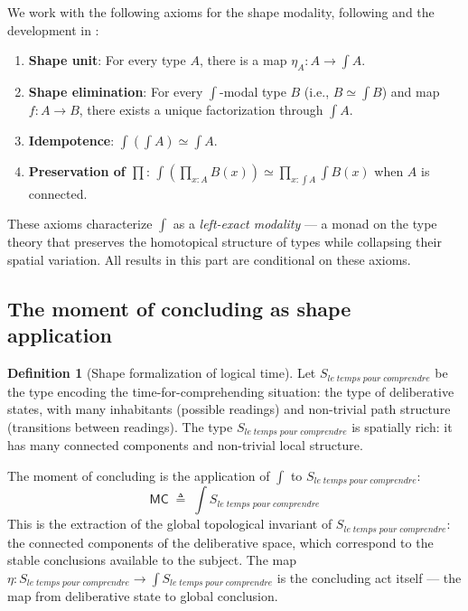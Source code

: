 \documentclass[12pt]{article}
\theoremstyle{definition}
\newtheorem{definition}{Definition}
\theoremstyle{remark}
\newcommand{\shapemod}{\int}                    %
\newcommand{\TC}{le\;temps\;pour\;comprendre}
\begin{document}
We work with the following axioms for the shape modality, following \cite{shulman2018} and the development in \cite{corfield2020}:

\begin{enumerate}
\item \textbf{Shape unit}: For every type $A$, there is a map $\eta_A : A \to \shapemod A$.
\item \textbf{Shape elimination}: For every $\shapemod$-modal type $B$ (i.e., $B \simeq \shapemod B$) and map $f : A \to B$, there exists a unique factorization through $\shapemod A$.
\item \textbf{Idempotence}: $\shapemod(\shapemod A) \simeq \shapemod A$.
\item \textbf{Preservation of $\prod$}: $\shapemod(\prod_{x:A} B(x)) \simeq \prod_{x:\shapemod A} \shapemod B(x)$ when $A$ is connected.
\end{enumerate}

These axioms characterize $\shapemod$ as a \emph{left-exact modality} --- a monad on the type theory that preserves the homotopical structure of types while collapsing their spatial variation. All results in this part are conditional on these axioms.

\subsection{The moment of concluding as shape application}

\begin{definition}[Shape formalization of logical time]
Let $S_{\TC}$ be the type encoding the time-for-comprehending situation: the type of deliberative states, with many inhabitants (possible readings) and non-trivial path structure (transitions between readings). The type $S_{\TC}$ is spatially rich: it has many connected components and non-trivial local structure.

The moment of concluding is the application of $\shapemod$ to $S_{\TC}$:
\[
\mathsf{MC} \;\triangleq\; \shapemod S_{\TC}
\]
This is the extraction of the global topological invariant of $S_{\TC}$: the connected components of the deliberative space, which correspond to the stable conclusions available to the subject. The map $\eta : S_{\TC} \to \shapemod S_{\TC}$ is the concluding act itself --- the map from deliberative state to global conclusion.
\end{definition}
\end{document}
